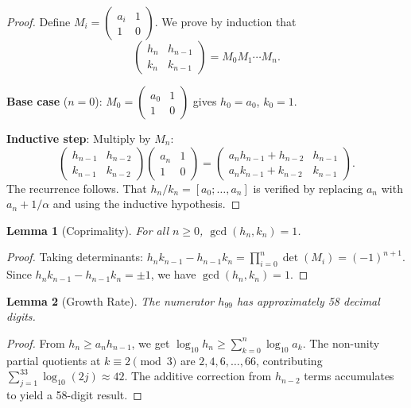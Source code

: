 \documentclass[12pt,a4paper]{article}
\newtheorem{lemma}{Lemma}
\begin{document}
\begin{proof}
Define $M_i = \begin{pmatrix} a_i & 1 \\ 1 & 0 \end{pmatrix}$. We prove by induction that
\[
\begin{pmatrix} h_n & h_{n-1} \\ k_n & k_{n-1} \end{pmatrix} = M_0 M_1 \cdots M_n.
\]

\textbf{Base case} ($n=0$): $M_0 = \begin{pmatrix} a_0 & 1 \\ 1 & 0 \end{pmatrix}$ gives $h_0 = a_0$, $k_0 = 1$.

\textbf{Inductive step}: Multiply by $M_n$:
\[
\begin{pmatrix} h_{n-1} & h_{n-2} \\ k_{n-1} & k_{n-2} \end{pmatrix} \begin{pmatrix} a_n & 1 \\ 1 & 0 \end{pmatrix} = \begin{pmatrix} a_n h_{n-1} + h_{n-2} & h_{n-1} \\ a_n k_{n-1} + k_{n-2} & k_{n-1} \end{pmatrix}.
\]
The recurrence follows. That $h_n/k_n = [a_0; \ldots, a_n]$ is verified by replacing $a_n$ with $a_n + 1/\alpha$ and using the inductive hypothesis.
\end{proof}

\begin{lemma}[Coprimality]
For all $n \ge 0$, $\gcd(h_n, k_n) = 1$.
\end{lemma}

\begin{proof}
Taking determinants: $h_n k_{n-1} - h_{n-1} k_n = \prod_{i=0}^{n} \det(M_i) = (-1)^{n+1}$. Since $h_n k_{n-1} - h_{n-1} k_n = \pm 1$, we have $\gcd(h_n, k_n) = 1$.
\end{proof}

\begin{lemma}[Growth Rate]
The numerator $h_{99}$ has approximately 58 decimal digits.
\end{lemma}

\begin{proof}
From $h_n \ge a_n h_{n-1}$, we get $\log_{10} h_n \ge \sum_{k=0}^n \log_{10} a_k$. The non-unity partial quotients at $k \equiv 2 \pmod{3}$ are $2, 4, 6, \ldots, 66$, contributing $\sum_{j=1}^{33} \log_{10}(2j) \approx 42$. The additive correction from $h_{n-2}$ terms accumulates to yield a 58-digit result.
\end{proof}
\end{document}
